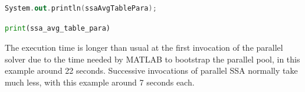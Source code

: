 \begin{KOTLIN}
\begin{lstlisting}[language=kotlin, basicstyle=\ttfamily\scriptsize]
System.out.println(ssaAvgTablePara);
\end{lstlisting}
\end{KOTLIN}
\begin{PYTHON}
\begin{lstlisting}[language=python]
print(ssa_avg_table_para)
\end{lstlisting}
\end{PYTHON}
The execution time is longer than usual at the first invocation of the parallel solver due to the time needed by MATLAB to bootstrap the parallel pool, in this example around 22 seconds. Successive invocations of parallel SSA normally take much less, with this example around 7 seconds each.

